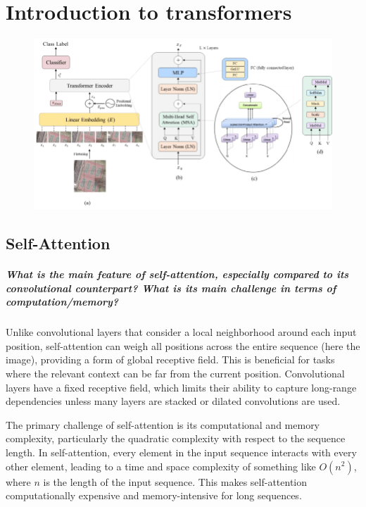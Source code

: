 \chapter{Introduction to transformers}

\begin{figure}[H]
    \centering
    \includegraphics*[width=.8\textwidth]{figs/Transformers/The-Vision-Transformer-architecture-a-the-main-architecture-of-the-model-b-the.png}
\end{figure}


\section{Self-Attention}
\paragraph{What is the main feature of self-attention, especially compared to its convolutional counterpart? What is its main challenge in terms of computation/memory?}\label{paragraph:complexity}
Unlike convolutional layers that consider a local neighborhood around each input position, self-attention can weigh all positions across the entire sequence (here the image), providing a form of global receptive field. This is beneficial for tasks where the relevant context can be far from the current position. Convolutional layers have a fixed receptive field, which limits their ability to capture long-range dependencies unless many layers are stacked or dilated convolutions are used.

The primary challenge of self-attention is its computational and memory complexity, particularly the quadratic complexity with respect to the sequence length. In self-attention, every element in the input sequence interacts with every other element, leading to a time and space complexity of something like $ O(n^2) $, where $n$ is the length of the input sequence. This makes self-attention computationally expensive and memory-intensive for long sequences.

